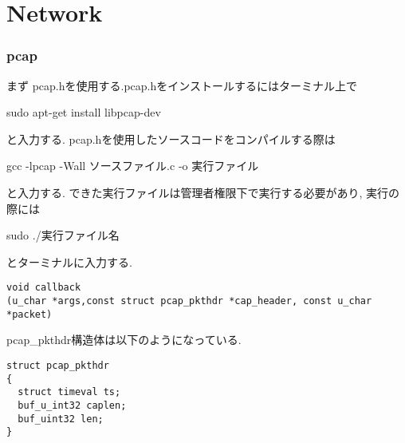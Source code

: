 \documentclass[a4paper]{article}%
\begin{document}
\part{Network}
\section{pcap}

まず pcap.hを使用する.pcap.hをインストールするにはターミナル上で

sudo apt-get install libpcap-dev 

と入力する. pcap.hを使用したソースコードをコンパイルする際は

gcc -lpcap -Wall ソースファイル.c -o 実行ファイル

と入力する. できた実行ファイルは管理者権限下で実行する必要があり, 実行の際には

sudo ./実行ファイル名

とターミナルに入力する.
\begin{lstlisting}[caption=pcap\_loopに使用するcallback関数の仕様,label=fuga]
void callback
(u_char *args,const struct pcap_pkthdr *cap_header, const u_char *packet)
\end{lstlisting}

pcap\_pkthdr構造体は以下のようになっている.
\begin{lstlisting}[caption=pcap\_pkthdr構造体,label=struct pcap_pkthdr]
struct pcap_pkthdr
{
  struct timeval ts;
  buf_u_int32 caplen;
  buf_uint32 len;
}
\end{lstlisting}
\end{document}
